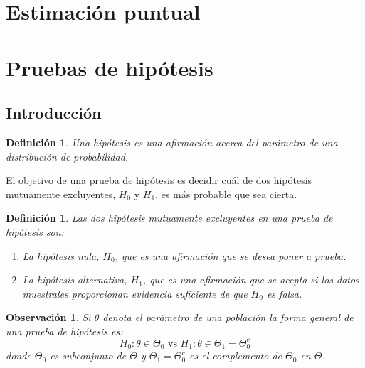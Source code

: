 \documentclass[14pt]{extarticle}
\newtheorem{definition}[theorem]{Definición}
\newtheorem{remark}{Observación}[section]
\begin{document}
\section{Estimación puntual}

\section{Pruebas de hipótesis}
\subsection{Introducción}

\begin{definition}
    Una hipótesis es una afirmación acerca del parámetro de una distribución de probabilidad.
\end{definition}

El objetivo de una prueba de hipótesis es decidir cuál de dos hipótesis mutuamente excluyentes, $H_0$ y $H_1$, es más probable que sea cierta.

\begin{definition}
Las dos hipótesis mutuamente excluyentes en una prueba de hipótesis son:
\begin{enumerate}
    \item La hipótesis nula, $H_0$, que es una afirmación que se desea poner a prueba.
    \item La hipótesis alternativa, $H_1$, que es una afirmación que se acepta si los datos muestrales proporcionan evidencia suficiente de que $H_0$ es falsa.
\end{enumerate}
\end{definition}

\begin{remark}
    Si $\theta$ denota el parámetro de una población la forma general de una prueba de hipótesis es:
    $$H_0: \theta \in \Theta_0 \text{ vs } H_1: \theta \in \Theta_1 = \Theta_0^c$$
    donde $\Theta_0$ es subconjunto de $\Theta$ y $\Theta_1 = \Theta_0^c$ es el complemento de $\Theta_0$ en $\Theta$.
\end{remark}
\end{document}
